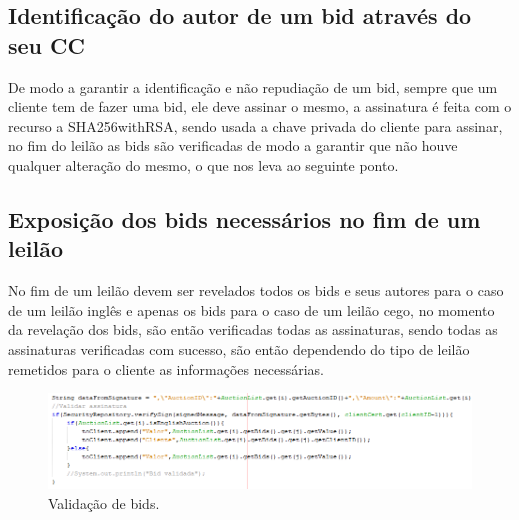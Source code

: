 \documentclass[pdftex,12pt,a4paper]{report}
\begin{document}
\vskip 1.5cm
\subsection{Identificação do autor de um bid através do seu CC}
De modo a garantir a identificação e não repudiação de um bid, sempre que um cliente tem de fazer uma bid, ele deve assinar o mesmo, a assinatura é feita com o recurso a SHA256withRSA, sendo usada a chave privada do cliente para assinar, no fim do leilão as bids são verificadas de modo a garantir que não houve qualquer alteração do mesmo, o que nos leva ao seguinte ponto.

\vskip 1.5cm
\subsection{Exposição dos bids necessários no fim de um leilão}
No fim de um leilão devem ser revelados todos os bids e seus autores para o caso de um leilão inglês e apenas os bids para o caso de um leilão cego, no momento da revelação dos bids, são então verificadas todas as assinaturas, sendo todas as assinaturas verificadas com sucesso, são então dependendo do tipo de leilão remetidos para o cliente as informações necessárias.
\begin{figure}[h]
    \centering
    \includegraphics[width=17.0cm]{expose.png}
    \caption{Validação de bids.}
    \label{fig:mesh1}
\end{figure}

\newpage
\vskip 1.5cm
\end{document}
